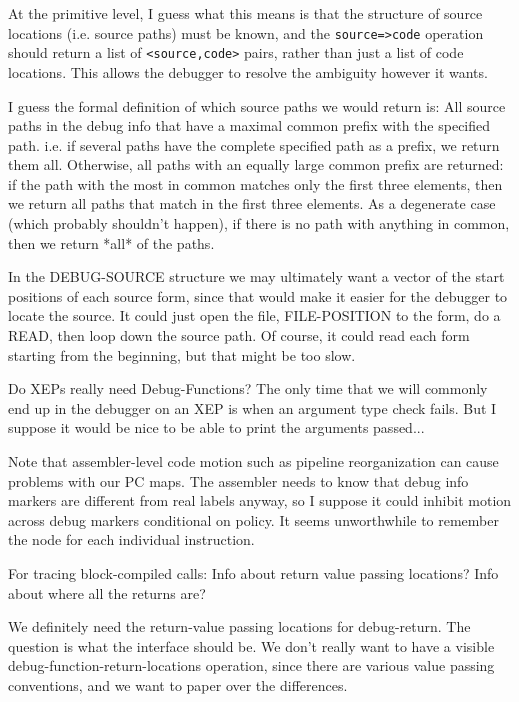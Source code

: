 At the primitive level, I guess what this means is that the structure of source
locations (i.e. source paths) must be known, and the \verb+source=>code+ operation
should return a list of \verb+<source,code>+ pairs, rather than just a list of code
locations.  This allows the debugger to resolve the ambiguity however it wants.

I guess the formal definition of which source paths we would return is:
    All source paths in the debug info that have a maximal common prefix with
    the specified path.  i.e. if several paths have the complete specified path
    as a prefix, we return them all.  Otherwise, all paths with an equally
    large common prefix are returned: if the path with the most in common
    matches only the first three elements, then we return all paths that match
    in the first three elements.  As a degenerate case (which probably
    shouldn't happen), if there is no path with anything in common, then we
    return *all* of the paths.



In the DEBUG-SOURCE structure we may ultimately want a vector of the start
positions of each source form, since that would make it easier for the debugger
to locate the source.  It could just open the file, FILE-POSITION to the form,
do a READ, then loop down the source path.  Of course, it could read each form
starting from the beginning, but that might be too slow.


Do XEPs really need Debug-Functions?  The only time that we will commonly end
up in the debugger on an XEP is when an argument type check fails.  But I
suppose it would be nice to be able to print the arguments passed...


Note that assembler-level code motion such as pipeline reorganization can cause
problems with our PC maps.  The assembler needs to know that debug info markers
are different from real labels anyway, so I suppose it could inhibit motion
across debug markers conditional on policy.  It seems unworthwhile to remember
the node for each individual instruction.


For tracing block-compiled calls:
    Info about return value passing locations?
    Info about where all the returns are?

We definitely need the return-value passing locations for debug-return.  The
question is what the interface should be.  We don't really want to have a
visible debug-function-return-locations operation, since there are various
value passing conventions, and we want to paper over the differences.


